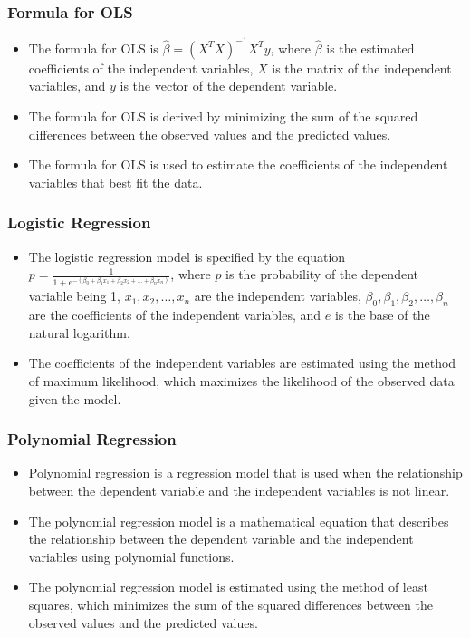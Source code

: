 \documentclass[serif, 9pt, aspectratio=32]{beamer}
\begin{document}
\begin{frame}
    \frametitle{Formula for OLS}
    \begin{itemize}
        \setlength{\itemsep}{2em}
        \item The formula for OLS is $\hat{\beta} = (X^T X)^{-1} X^T y$, where $\hat{\beta}$ is the estimated coefficients of the independent variables, $X$ is the matrix of the independent variables, and $y$ is the vector of the dependent variable.
        \item The formula for OLS is derived by minimizing the sum of the squared differences between the observed values and the predicted values.
        \item The formula for OLS is used to estimate the coefficients of the independent variables that best fit the data.
    \end{itemize}
\end{frame}

\begin{frame}
    \frametitle{Logistic Regression}
    \begin{itemize}
        \setlength{\itemsep}{2em}
        \item The logistic regression model is specified by the equation $p = \frac{1}{1 + e^{-(\beta_0 + \beta_1 x_1 + \beta_2 x_2 + \ldots + \beta_n x_n)}}$, where $p$ is the probability of the dependent variable being 1, $x_1, x_2, \ldots, x_n$ are the independent variables, $\beta_0, \beta_1, \beta_2, \ldots, \beta_n$ are the coefficients of the independent variables, and $e$ is the base of the natural logarithm.
        \item The coefficients of the independent variables are estimated using the method of maximum likelihood, which maximizes the likelihood of the observed data given the model.
    \end{itemize}
\end{frame}

\begin{frame}
    \frametitle{Polynomial Regression}
    \begin{itemize}
        \setlength{\itemsep}{2em}
        \item Polynomial regression is a regression model that is used when the relationship between the dependent variable and the independent variables is not linear.
        \item The polynomial regression model is a mathematical equation that describes the relationship between the dependent variable and the independent variables using polynomial functions.
        \item The polynomial regression model is estimated using the method of least squares, which minimizes the sum of the squared differences between the observed values and the predicted values.
    \end{itemize}
\end{frame}
\end{document}
